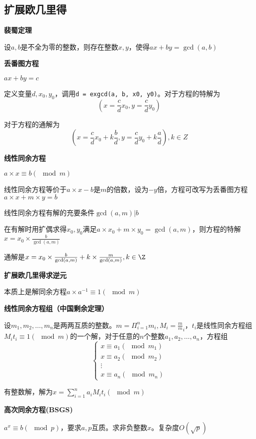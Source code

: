 \subsection{扩展欧几里得}
\textbf{裴蜀定理}

设$a,b$是不全为零的整数，则存在整数$x,y$，使得$ax+by=\gcd(a,b)$


\textbf{丢番图方程}

$ax+by=c$

定义变量$d,x_0,y_0$，调用\verb|d = exgcd(a, b, x0, y0)|。对于方程的特解为
\[
(x=\frac c d x_0 , y = \frac c d y_0)
\]

对于方程的通解为
\[
(x = \frac c d x_0 + k \frac b d , y = \frac c d y_0 + k \frac a d ) ,k \in Z
\]

\textbf{线性同余方程}

$a\times x\equiv b(\mod m)$

线性同余方程等价于$a\times x - b$是$m$的倍数，设为$-y$倍，方程可改写为丢番图方程$a \times x + m\times y=b$

线性同余方程有解的充要条件$\gcd(a,m)|b$

在有解时用扩偶求得$x_0,y_0$满足$a\times x_0+m\times y_0=\gcd(a,m)$，则方程的特解$x=x_0\times \frac b{\gcd(a,m)}$

通解是$x=x_0\times \frac b{\gcd(a,m)} + k\times \frac{m}{\gcd(a,m)},k\in \Z$



\textbf{扩展欧几里得求逆元}

本质上是解同余方程$a\times a^{-1} \equiv 1 (\mod m)$



\textbf{线性同余方程组（中国剩余定理）}

设$m_1,m_2,\dots,m_n$是两两互质的整数。$m=\Pi_{i=1}^nm_i,M_i=\frac m m_i$，$t_i$是线性同余方程组$M_it_i\equiv 1(\mod m)$的一个解，对于任意的$n$个整数$a_1,a_2,\dots,a_n$，方程组
\[
\left\{\begin{matrix}
           x\equiv a_1(\mod m_1)\\
           x\equiv a_2(\mod m_2)\\
           \vdots \\
           x\equiv a_n(\mod m_n)
\end{matrix}\right.
\]


有整数解，解为$x=\sum_{i=1}^na_iM_it_i(\mod m)$



\textbf{高次同余方程(BSGS)}

$a^x\equiv b (\mod p)$，要求$a,p$互质。求非负整数$x$。复杂度$O(\sqrt p)$
